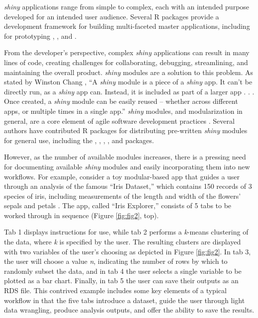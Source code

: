 \emph{shiny} applications range from simple to complex, each with an intended purpose developed for an intended user audience. Several R packages provide a development framework for building multi-faceted master applications, including  for prototyping \citep{shinipsum},  \citep{golum}, and  \citep{rhino}.

From the developer's perspective, complex \emph{shiny} applications can result in many lines of code, creating challenges for collaborating, debugging, streamlining, and maintaining the overall product. \emph{shiny} modules are a solution to this problem. As stated by Winston Chang \citep{shinyblog}, ``A \emph{shiny} module is a piece of a \emph{shiny} app. It can't be directly run, as a \emph{shiny} app can. Instead, it is included as part of a larger app . . . Once created, a \emph{shiny} module can be easily reused -- whether across different apps, or multiple times in a single app.'' \emph{shiny} modules, and modularization in general, are a core element of agile software development practices \citep{larman2004agile}. Several authors have contributed R packages for distributing pre-written \emph{shiny} modules for general use, including the  \citep{datamods},  \citep{reglog},  \citep{periscope},  \citep{shinyauthr}, and  \citep{jsmodule} packages.

However, as the number of available modules increases, there is a pressing need for documenting available \emph{shiny} modules and easily incorporating them into new workflows. For example, consider a toy modular-based app that guides a user through an analysis of the famous ``Iris Dataset,'' which contains 150 records of 3 species of iris, including measurements of the length and width of the flowers' sepals and petals \citep{fisher1936use}. The app, called ``Iris Explorer,'' consists of 5 tabs to be worked through in sequence (Figure \ref{fig:fig2}, top).

Tab 1 displays instructions for use, while tab 2 performs a \emph{k}-means clustering of the data, where \emph{k} is specified by the user. The resulting clusters are displayed with two variables of the user's choosing as depicted in Figure \ref{fig:fig2}. In tab 3, the user will choose a value \emph{n}, indicating the number of rows by which to randomly subset the data, and in tab 4 the user selects a single variable to be plotted as a bar chart. Finally, in tab 5 the user can save their outputs as an RDS file. This contrived example includes some key elements of a typical workflow in that the five tabs introduce a dataset, guide the user through light data wrangling, produce analysis outputs, and offer the ability to save the results.


